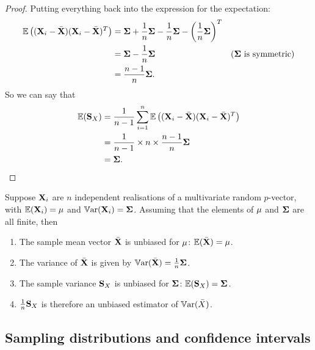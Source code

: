 \documentclass[10pt, a4paper]{article}
\begin{document}
\begin{theorem}
\begin{proof}
        Putting everything back into the expression for the expectation:
        \begin{align*}
            \mathbb{E}\left((\mathbf{X}_i - \bar{\mathbf{X}})(\mathbf{X}_i - \bar{\mathbf{X}}) ^ T\right) &= \mathbf{\Sigma} + \frac{1}{n}\mathbf{\Sigma} - \frac{1}{n}\mathbf{\Sigma} - \left(\frac{1}{n}\mathbf{\Sigma}\right) ^ T \\
            &= \mathbf{\Sigma} - \frac{1}{n}\mathbf{\Sigma} &(\mathbf{\Sigma}\text{ is symmetric}) \\
            &= \frac{n - 1}{n}\mathbf{\Sigma}.
        \end{align*}
        So we can say that
        \begin{align*}
            \mathbb{E}(\mathbf{S}_X) &= \frac{1}{n - 1}\sum_{i = 1}^{n}\mathbb{E}\left((\mathbf{X}_i - \bar{\mathbf{X}})(\mathbf{X}_i - \bar{\mathbf{X}}) ^ T\right) \\
            &= \frac{1}{n - 1} \times n \times \frac{n - 1}{n}\mathbf{\Sigma} \\
            &= \mathbf{\Sigma}.
        \end{align*}
    \end{proof}
\end{theorem}

\begin{theorem}
    Suppose $\mathbf{X}_i$ are $n$ independent realisations of a multivariate random $p$-vector,
    with $\mathbb{E}(\mathbf{X}_i) = \mathbf{\mu}$ and $\mathbb{V}\mathrm{ar}(\mathbf{X}_i) = \mathbf{\Sigma}$.
    Assuming that the elements of $\mathbf{\mu}$ and $\mathbf{\Sigma}$ are all finite,
    then
    
    \begin{enumerate}[label = (\alph*)]
        \item The sample mean vector $\bar{\mathbf{X}}$ is unbiased for $\mathbf{\mu}$:
        $\mathbb{E}(\bar{\mathbf{X}}) = \mathbf{\mu}$.

        \item The variance of $\bar{\mathbf{X}}$ is given by $\mathbb{V}\mathrm{ar}(\bar{\mathbf{X}}) = \frac{1}{n}\mathbf{\Sigma}$.

        \item The sample variance $\mathbf{S}_X$ is unbiased for $\mathbf{\Sigma}$:
        $\mathbb{E}(\mathbf{S}_X) = \mathbf{\Sigma}$.

        \item $\frac{1}{n}\mathbf{S}_X$ is therefore an unbiased estimator of $\mathbb{V}\mathrm{ar}(\bar{X})$.
    \end{enumerate}
\end{theorem}

\subsection{Sampling distributions and confidence intervals}
\end{document}
